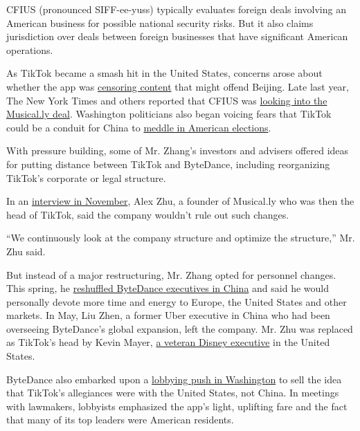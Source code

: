CFIUS (pronounced SIFF-ee-yuss) typically evaluates foreign deals
involving an American business for possible national security risks. But
it also claims jurisdiction over deals between foreign businesses that
have significant American operations.

As TikTok became a smash hit in the United States, concerns arose about
whether the app was
\href{https://www.theguardian.com/technology/2019/sep/25/revealed-how-tiktok-censors-videos-that-do-not-please-beijing}{censoring
content} that might offend Beijing. Late last year, The New York Times
and others reported that CFIUS was
\href{https://www.nytimes3xbfgragh.onion/2019/11/01/technology/tiktok-national-security-review.html}{looking
into the Musical.ly deal}. Washington politicians also began voicing
fears that TikTok could be a conduit for China to
\href{https://thehill.com/policy/technology/467280-schumer-cotton-request-tiktok-security-assessment}{meddle
in American elections}.

With pressure building, some of Mr. Zhang's investors and advisers
offered ideas for putting distance between TikTok and ByteDance,
including reorganizing TikTok's corporate or legal structure.

In an
\href{https://www.nytimes3xbfgragh.onion/2019/11/18/technology/tiktok-alex-zhu-interview.html}{interview
in November}, Alex Zhu, a founder of Musical.ly who was then the head of
TikTok, said the company wouldn't rule out such changes.

``We continuously look at the company structure and optimize the
structure,'' Mr. Zhu said.

But instead of a major restructuring, Mr. Zhang opted for personnel
changes. This spring, he
\href{https://mp.weixin.qq.com/s/OWrC9iXHxgUZtaLm8GN4ow}{reshuffled
ByteDance executives in China} and said he would personally devote more
time and energy to Europe, the United States and other markets. In May,
Liu Zhen, a former Uber executive in China who had been overseeing
ByteDance's global expansion, left the company. Mr. Zhu was replaced as
TikTok's head by Kevin Mayer,
\href{https://www.nytimes3xbfgragh.onion/2020/05/18/business/media/tiktok-ceo-kevin-mayer.html}{a
veteran Disney executive} in the United States.

ByteDance also embarked upon a
\href{https://www.nytimes3xbfgragh.onion/2020/07/15/technology/tiktok-washington-lobbyist.html}{lobbying
push in Washington} to sell the idea that TikTok's allegiances were with
the United States, not China. In meetings with lawmakers, lobbyists
emphasized the app's light, uplifting fare and the fact that many of its
top leaders were American residents.

